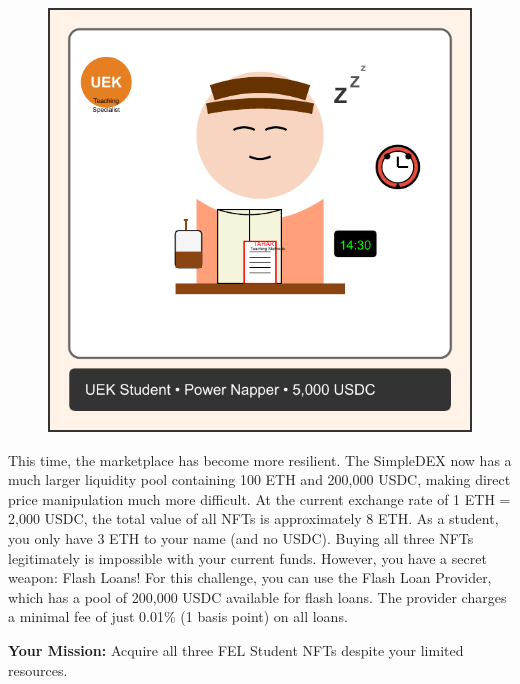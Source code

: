 \documentclass[12pt]{article}
\begin{document}
\begin{figure}[h!]
\begin{minipage}{0.3\textwidth}
  \end{minipage}
  \hfill
  \begin{minipage}{0.3\textwidth}
    \includegraphics[width=\textwidth]{NFTs/nft-uek-power-napper.pdf}
  \end{minipage}
\end{figure}

This time, the marketplace has become more resilient. The SimpleDEX now has a much larger liquidity pool containing 100 ETH and 200,000 USDC, making direct price manipulation much more difficult. At the current exchange rate of 1 ETH = 2,000 USDC, the total value of all NFTs is approximately 8 ETH. As a student, you only have 3 ETH to your name (and no USDC). Buying all three NFTs legitimately is impossible with your current funds. However, you have a secret weapon: Flash Loans! For this challenge, you can use the Flash Loan Provider, which has a pool of 200,000 USDC available for flash loans. The provider charges a minimal fee of just 0.01\% (1 basis point) on all loans.

\medskip
\noindent
\textbf{Your Mission:} Acquire all three FEL Student NFTs despite your limited resources.
\end{document}
